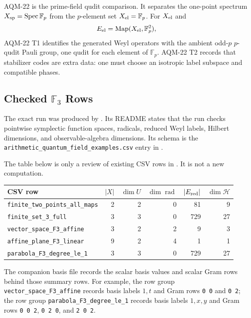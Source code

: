 AQM-22 is the prime-field qudit comparison.  It separates the one-point
spectrum \(X_{\rm sp}=\operatorname{Spec}\mathbb F_p\) from the \(p\)-element set
\(X_{\rm el}=\mathbb F_p\).  For \(X_{\rm el}\) and
\[
  E_{\rm el}=\operatorname{Map}(X_{\rm el},\mathbb F_p^2),
\]
AQM-22 T1 identifies the generated Weyl operators with the ambient
odd-\(p\) \(p\)-qudit Pauli group, one qudit for each element of
\(\mathbb F_p\).  AQM-22 T2 records that stabilizer codes are extra data:
one must choose an isotropic label subspace and compatible phases.

\subsection{Checked \texorpdfstring{\(\mathbb F_3\)}{F3} Rows}

The exact run
 was produced by
.  Its README states that
the run checks pointwise symplectic function spaces, radicals, reduced Weyl
labels, Hilbert dimensions, and observable-algebra dimensions.  Its schema is
the \texttt{arithmetic\_quantum\_field\_examples.csv} entry in
.

The table below is only a review of existing CSV rows in
.
It is not a new computation.

\begin{center}
\small
\begin{tabular}{lrrrrr}
\toprule
CSV row & \(|X|\) & \(\dim U\) & \(\dim\operatorname{rad}\) & \(|E_{\rm red}|\) & \(\dim\mathcal H\)\\
\midrule
\texttt{finite\_two\_points\_all\_maps} & 2 & 2 & 0 & 81 & 9\\
\texttt{finite\_set\_3\_full} & 3 & 3 & 0 & 729 & 27\\
\texttt{vector\_space\_F3\_affine} & 3 & 2 & 2 & 9 & 3\\
\texttt{affine\_plane\_F3\_linear} & 9 & 2 & 4 & 1 & 1\\
\texttt{parabola\_F3\_degree\_le\_1} & 3 & 3 & 0 & 729 & 27\\
\bottomrule
\end{tabular}
\end{center}

The companion basis file
records the scalar basis values and scalar Gram rows behind those summary
rows.  For example, the row group
\texttt{vector\_space\_F3\_affine} records basis labels \(1,t\) and Gram rows
\texttt{0 0} and \texttt{0 2}; the row group
\texttt{parabola\_F3\_degree\_le\_1} records basis labels \(1,x,y\) and Gram
rows \texttt{0 0 2}, \texttt{0 2 0}, and \texttt{2 0 2}.

